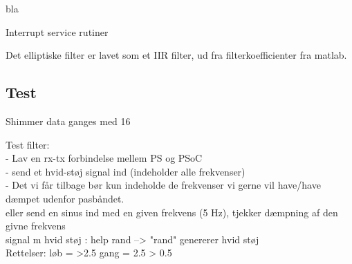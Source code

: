 bla 





Interrupt service rutiner

Det elliptiske filter er lavet som et IIR filter, ud fra filterkoefficienter fra matlab.




\subsection{Test}

Shimmer data ganges med 16


Test filter:\\
- Lav en rx-tx forbindelse mellem PS og PSoC\\
- send et hvid-støj signal ind (indeholder alle frekvenser)\\
- Det vi får tilbage bør kun indeholde de frekvenser vi gerne vil have/have dæmpet udenfor pasbåndet. \\

eller send en sinus ind med en given frekvens (5 Hz), tjekker dæmpning af den givne frekvens\\

signal m hvid støj : help rand --> "rand" genererer hvid støj\\












Rettelser:
løb = >2.5
gang = 2.5 > 0.5
